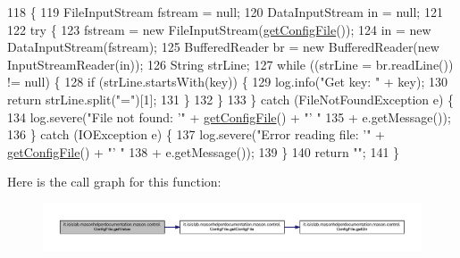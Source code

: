 \begin{DoxyCode}
118                                               \{
119         FileInputStream fstream = null;
120         DataInputStream in = null;
121 
122         \textcolor{keywordflow}{try} \{
123             fstream = \textcolor{keyword}{new} FileInputStream(\hyperlink{classit_1_1isislab_1_1masonhelperdocumentation_1_1mason_1_1control_1_1_config_file_ac533dd01e862be359ae060d278daf1ea}{getConfigFile}());
124             in = \textcolor{keyword}{new} DataInputStream(fstream);
125             BufferedReader br = \textcolor{keyword}{new} BufferedReader(\textcolor{keyword}{new} InputStreamReader(in));
126             String strLine;
127             \textcolor{keywordflow}{while} ((strLine = br.readLine()) != null) \{
128                 \textcolor{keywordflow}{if} (strLine.startsWith(key)) \{
129                     log.info(\textcolor{stringliteral}{"Get key: "} + key);
130                     \textcolor{keywordflow}{return} strLine.split(\textcolor{stringliteral}{"="})[1];
131                 \}
132             \}
133         \} \textcolor{keywordflow}{catch} (FileNotFoundException e) \{
134             log.severe(\textcolor{stringliteral}{"File not found: '"} + \hyperlink{classit_1_1isislab_1_1masonhelperdocumentation_1_1mason_1_1control_1_1_config_file_ac533dd01e862be359ae060d278daf1ea}{getConfigFile}() + \textcolor{stringliteral}{"' "}
135                     + e.getMessage());
136         \} \textcolor{keywordflow}{catch} (IOException e) \{
137             log.severe(\textcolor{stringliteral}{"Error reading file: '"} + \hyperlink{classit_1_1isislab_1_1masonhelperdocumentation_1_1mason_1_1control_1_1_config_file_ac533dd01e862be359ae060d278daf1ea}{getConfigFile}() + \textcolor{stringliteral}{"' "}
138                     + e.getMessage());
139         \}
140         \textcolor{keywordflow}{return} \textcolor{stringliteral}{""};
141     \}
\end{DoxyCode}


Here is the call graph for this function\-:
\nopagebreak
\begin{figure}[H]
\begin{center}
\leavevmode
\includegraphics[width=350pt]{classit_1_1isislab_1_1masonhelperdocumentation_1_1mason_1_1control_1_1_config_file_a7bcf08b34e48f0c5116d796d616113f0_cgraph}
\end{center}
\end{figure}




